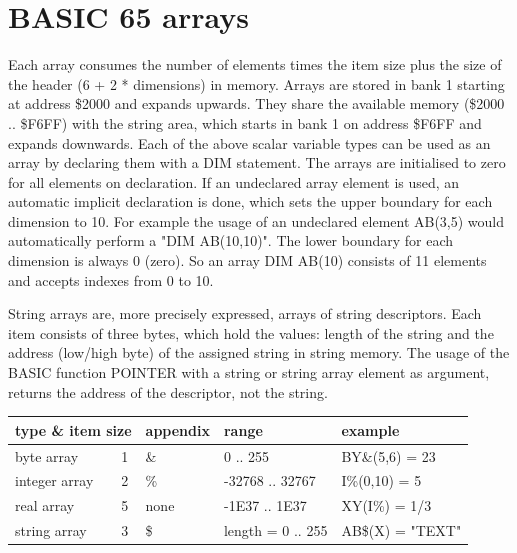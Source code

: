 \section{BASIC 65 arrays}

Each array consumes the number of elements times the item size
plus the size of the header (6 + 2 * dimensions) in memory.
Arrays are stored in bank 1 starting at address \$2000 and expands upwards.
They share the available memory (\$2000 .. \$F6FF) with the string area,
which starts in bank 1 on address \$F6FF and expands downwards.
Each of the above scalar variable types can be used as an array by declaring
them with a DIM statement. The arrays are initialised to zero for all
elements on declaration. If an undeclared array element is used,
an automatic implicit declaration is done, which sets the upper  boundary
for each dimension to 10. For example the usage of an undeclared element
AB(3,5) would automatically perform a "DIM AB(10,10)".
The lower boundary for each dimension is always 0 (zero).
So an array DIM AB(10) consists of 11 elements and accepts indexes from
0 to 10.

String arrays are, more precisely expressed, arrays of string
descriptors. Each item consists of three bytes, which hold
the values: length of the string and the address (low/high byte)
of the assigned string in string memory.
The usage of the BASIC function POINTER with a string or
string array element as argument, returns the address of the descriptor, not the string.

{\ttfamily
\setlength{\tabcolsep}{1mm}
\begin{tabular}{|l|l|l|l|l|}
\hline
\multicolumn{2}{|l|}{type \& item size} & appendix & range    & example  \\
\hline
byte     array &  1     &    \&    & 0 .. 255        & BY\&(5,6) = 23 \\
integer  array &  2     &    \%    & -32768 .. 32767 & I\%(0,10) = 5    \\
real     array &  5     &   none   & -1E37 .. 1E37   & XY(I\%) = 1/3   \\
string   array &  3     &    \$    & length = 0 .. 255 & AB\$(X) = "TEXT" \\
\hline
\end{tabular}
}

\newpage
